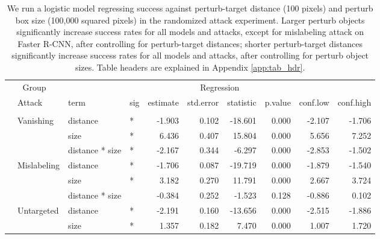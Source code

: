 \begin{longtable}[t]{llllrrrrrr}
\caption{\label{tab:perturb_bbox_and_object_dist_table}We run a logistic model regressing success against perturb-target distance (100 pixels) and perturb box size (100,000 squared pixels) in the randomized attack experiment. Larger perturb objects significantly increase success rates for all models and attacks, except for mislabeling attack on Faster R-CNN, after controlling for perturb-target distances; shorter perturb-target distances significantly increase success rates for all models and attacks, after controlling for perturb object sizes. Table headers are explained in Appendix \ref{app:tab_hdr}.}\\
\toprule
\multicolumn{2}{c}{Group} & \multicolumn{8}{c}{Regression} \\
\cmidrule(l{3pt}r{3pt}){1-2} \cmidrule(l{3pt}r{3pt}){3-10}
 & Attack & term & sig & estimate & std.error & statistic & p.value & conf.low & conf.high\\
\midrule
\addlinespace[0.3em]
\multicolumn{10}{l}{\textbf{YOLOv3}}\\
\hspace{1em} & Vanishing & distance & * & -1.903 & 0.102 & -18.601 & 0.000 & -2.107 & -1.706\\
\cmidrule{3-10}\nopagebreak
\hspace{1em} &  & size & * & 6.436 & 0.407 & 15.804 & 0.000 & 5.656 & 7.252\\
\cmidrule{3-10}\nopagebreak
\hspace{1em} &  & distance * size & * & -2.167 & 0.344 & -6.297 & 0.000 & -2.853 & -1.502\\
\cmidrule{2-10}\nopagebreak
\hspace{1em} & Mislabeling & distance & * & -1.706 & 0.087 & -19.719 & 0.000 & -1.879 & -1.540\\
\cmidrule{3-10}\nopagebreak
\hspace{1em} &  & size & * & 3.182 & 0.270 & 11.791 & 0.000 & 2.667 & 3.724\\
\cmidrule{3-10}\nopagebreak
\hspace{1em} &  & distance * size &  & -0.384 & 0.252 & -1.523 & 0.128 & -0.886 & 0.102\\
\cmidrule{2-10}\nopagebreak
\hspace{1em} & Untargeted & distance & * & -2.191 & 0.160 & -13.656 & 0.000 & -2.515 & -1.886\\
\cmidrule{3-10}\nopagebreak
\hspace{1em} &  & size & * & 1.357 & 0.182 & 7.470 & 0.000 & 1.007 & 1.720\\

\end{longtable}
